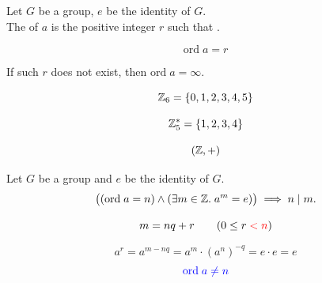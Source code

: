 
\begin{frame}
  \begin{definition}
    Let $G$ be a group, $e$ be the identity of $G$. \\[3pt]
    The  of $a$ is the  positive integer $r$
    such that .

    \[
      \text{ord}\; a = r
    \]
  \end{definition}

  \pause
  \vspace{0.50cm}
  \begin{center}
    If such $r$ does not exist, then $\text{ord}\; a = \infty$.
  \end{center}
\end{frame}

\begin{frame}
  \[
    \mathbb{Z}_{6} = \{0, 1, 2, 3, 4, 5\}
  \]

  \pause
  \[
    \mathbb{Z}^{\ast}_{5} = \{1, 2, 3, 4\}
  \]

  \pause
  \[
    (\mathbb{Z}, +)
  \]
\end{frame}

\begin{frame}{}
  \begin{theorem}
    Let $G$ be a group and $e$ be the identity of $G$.
    \[
      \big((\text{ord}\; a = n) \land (\exists m \in \mathbb{Z}.\; a^{m} = e) \big)
        \implies n \mid m.
    \]
  \end{theorem}

  \pause
  \[
    m = nq + r \qquad (0 \le r \;\textcolor{red}{< n})
  \]

  \pause
  \begin{center}
    \[
      a^{r} = a^{m - nq} = a^m \cdot (a^{n})^{-q} = e \cdot e = e
    \]
    \pause
    \[
      \textcolor{blue}{\text{ord}\; a \neq n}
    \]
  \end{center}
\end{frame}

